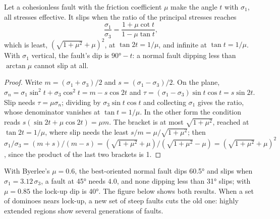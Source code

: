 \begin{proposition}\label{prop:b3:extension-strike-slip:lockup}
Let a cohesionless fault with the friction coefficient $\mu$ make the angle
$t$ with $\sigma_1$, all stresses effective. It slips when the ratio of the
principal stresses reaches
\[
  \frac{\sigma_1}{\sigma_3} = \frac{1 + \mu\cot t}{1 - \mu\tan t} ,
\]
which is least, $(\sqrt{1 + \mu^2} + \mu)^2$, at $\tan2t = 1/\mu$, and
infinite at $\tan t = 1/\mu$. With $\sigma_1$ vertical, the fault's dip is
$\ang{90} - t$: a normal fault dipping less than $\arctan\mu$ cannot slip at
all.
\end{proposition}

\begin{proof}
Write $m = (\sigma_1 + \sigma_3)/2$ and $s = (\sigma_1 - \sigma_3)/2$. On
the plane, $\sigma_n = \sigma_1\sin^2t + \sigma_3\cos^2t = m - s\cos2t$ and
$\tau = (\sigma_1 - \sigma_3)\sin t\cos t = s\sin2t$. Slip needs $\tau =
\mu\sigma_n$; dividing by $\sigma_3\sin t\cos t$ and collecting $\sigma_1$
gives the ratio, whose denominator vanishes at $\tan t = 1/\mu$. In the other
form the condition reads $s(\sin2t + \mu\cos2t) = \mu m$. The bracket is at
most $\sqrt{1 + \mu^2}$, reached at $\tan2t = 1/\mu$, where slip needs the
least $s/m = \mu/\sqrt{1 + \mu^2}$; then $\sigma_1/\sigma_3 = (m + s)/(m - s) =
(\sqrt{1 + \mu^2} + \mu)/(\sqrt{1 + \mu^2} - \mu) = (\sqrt{1 + \mu^2} +
\mu)^2$, since the product of the last two brackets is 1.
\end{proof}

With Byerlee's $\mu = 0.6$, the best-oriented normal fault dips \ang{60.5} and
slips when $\sigma_1 = 3.12\,\sigma_3$, a fault at \ang{45} needs $4.0$, and
none dipping less than \ang{31} slips; with $\mu = 0.85$ the lock-up dip is
\ang{40}. The figure below shows both results. When a set of dominoes nears
lock-up, a new set of steep faults cuts the old one: highly extended regions
show several generations of faults.

